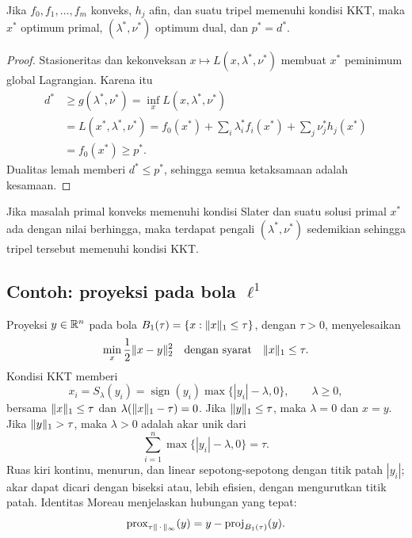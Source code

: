 \begin{theorem}
  Jika $f_0,f_1,\ldots,f_m$ konveks, $h_j$ afin, dan suatu tripel memenuhi
  kondisi KKT, maka $x^*$ optimum primal, $(\lambda^*,\nu^*)$ optimum dual,
  dan $p^*=d^*$.
\end{theorem}
\begin{proof}
  Stasioneritas dan kekonveksan
  $x\mapsto L(x,\lambda^*,\nu^*)$ membuat $x^*$ peminimum global Lagrangian.
  Karena itu
  \begin{equation}
    \begin{aligned}
      d^*&\geq g(\lambda^*,\nu^*)
        =\inf_xL(x,\lambda^*,\nu^*)\\
      &=L(x^*,\lambda^*,\nu^*)
        =f_0(x^*)
         +\sum_i\lambda_i^*f_i(x^*)
         +\sum_j\nu_j^*h_j(x^*)\\
      &=f_0(x^*)\geq p^*.
    \end{aligned}
  \end{equation}
  Dualitas lemah memberi $d^*\leq p^*$, sehingga semua ketaksamaan adalah
  kesamaan.
\end{proof}

\begin{theorem}
  Jika masalah primal konveks memenuhi kondisi Slater dan suatu solusi primal
  $x^*$ ada dengan nilai berhingga, maka terdapat pengali
  $(\lambda^*,\nu^*)$ sedemikian sehingga tripel tersebut memenuhi kondisi
  KKT.
\end{theorem}

\subsection{Contoh: proyeksi pada bola $\ell^1$}

Proyeksi $y\in\mathbb{R}^n$ pada bola
$B_1(\tau)=\{x:\|x\|_1\leq\tau\}$, dengan $\tau>0$, menyelesaikan
\begin{equation}
  \min_x \frac12\|x-y\|_2^2
  \quad\text{dengan syarat}\quad \|x\|_1\leq\tau.
\end{equation}
Kondisi KKT memberi
\begin{equation}
  x_i=S_\lambda(y_i)
  =\operatorname{sign}(y_i)\max\{|y_i|-\lambda,0\},
  \qquad \lambda\geq0,
\end{equation}
bersama $\|x\|_1\leq\tau$ dan
$\lambda(\|x\|_1-\tau)=0$. Jika $\|y\|_1\leq\tau$, maka
$\lambda=0$ dan $x=y$. Jika $\|y\|_1>\tau$, maka $\lambda>0$ adalah akar
unik dari
\begin{equation}
  \sum_{i=1}^{n}\max\{|y_i|-\lambda,0\}=\tau.
\end{equation}
Ruas kiri kontinu, menurun, dan linear sepotong-sepotong dengan titik patah
$|y_i|$; akar dapat dicari dengan biseksi atau, lebih efisien, dengan
mengurutkan titik patah. Identitas Moreau menjelaskan hubungan yang tepat:
\begin{equation}
  \mathrm{prox}_{\tau\|\,\cdot\,\|_\infty}(y)
  =y-\operatorname{proj}_{B_1(\tau)}(y).
\end{equation}

